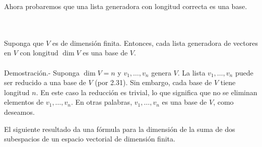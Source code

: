 Ahora probaremos que una lista generadora con longitud correcta es una base.

\begin{myteo}\,\\\\
	Suponga que $V$ es de dimensión finita. Entonces, cada lista generadora de vectores en $V$ con longitud $\dim V$ es una base de $V$.\\\\
	    Demostración.-\; Suponga $\dim V=n$ y $v_1,\ldots,v_n$ genera $V$. La lista $v_1,\ldots,v_n$ puede ser reducido a una base de $V$ (por 2.31). Sin embargo, cada base de $V$ tiene longitud $n$. En este caso la reducción es trivial, lo que significa que no se eliminan elementos de $v_1,\ldots,v_n$. En otras palabras, $v_1,\ldots,v_n$ es una base de $V$, como deseamos.
\end{myteo}

El siguiente resultado da una fórmula para la dimensión de la suma de dos subespacios de un espacio vectorial de dimensión finita.


